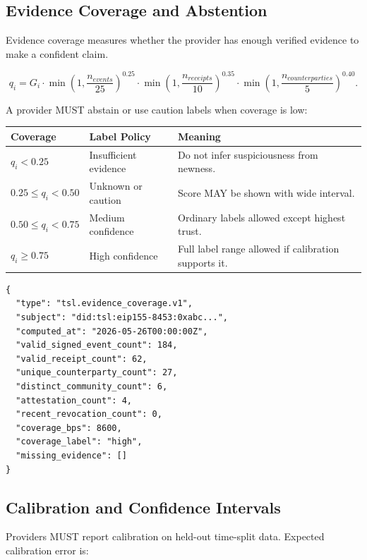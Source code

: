 \documentclass[11pt]{article}
\begin{document}
\subsection{Evidence Coverage and Abstention}

Evidence coverage measures whether the provider has enough verified evidence to make a confident claim.

\begin{equation}
q_i=G_i\cdot \min\left(1,\frac{n_{events}}{25}\right)^{0.25}\cdot
\min\left(1,\frac{n_{receipts}}{10}\right)^{0.35}\cdot
\min\left(1,\frac{n_{counterparties}}{5}\right)^{0.40}.
\end{equation}

A provider MUST abstain or use caution labels when coverage is low:

\begin{center}
\begin{tabularx}{\textwidth}{>{\bfseries}p{} p{} X}
\toprule
Coverage & Label Policy & Meaning \\
\midrule
\(q_i<0.25\) & Insufficient evidence & Do not infer suspiciousness from newness. \\
\(0.25\leq q_i<0.50\) & Unknown or caution & Score MAY be shown with wide interval. \\
\(0.50\leq q_i<0.75\) & Medium confidence & Ordinary labels allowed except highest trust. \\
\(q_i\geq0.75\) & High confidence & Full label range allowed if calibration supports it. \\
\bottomrule
\end{tabularx}
\end{center}

\begin{lstlisting}[style=tslcode]
{
  "type": "tsl.evidence_coverage.v1",
  "subject": "did:tsl:eip155-8453:0xabc...",
  "computed_at": "2026-05-26T00:00:00Z",
  "valid_signed_event_count": 184,
  "valid_receipt_count": 62,
  "unique_counterparty_count": 27,
  "distinct_community_count": 6,
  "attestation_count": 4,
  "recent_revocation_count": 0,
  "coverage_bps": 8600,
  "coverage_label": "high",
  "missing_evidence": []
}
\end{lstlisting}

\subsection{Calibration and Confidence Intervals}

Providers MUST report calibration on held-out time-split data. Expected calibration error is:
\end{document}
